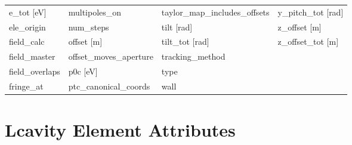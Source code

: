 \begin{tabular}{llll}
e_tot [eV]                       & multipoles_on                    & taylor_map_includes_offsets      & y_pitch_tot [rad]                \\
ele_origin                       & num_steps                        & tilt [rad]                       & z_offset [m]                     \\
field_calc                       & offset [m]                       & tilt_tot [rad]                   & z_offset_tot [m]                 \\
field_master                     & offset_moves_aperture            & tracking_method                  &                                  \\
field_overlaps                   & p0c [eV]                         & type                             &                                  \\
fringe_at                        & ptc_canonical_coords             & wall                             &                                  \\
 \bottomrule
 \end{tabular}
 \vfill
 
 \section{Lcavity Element Attributes}
 \label{s:list.lcavity}
 
